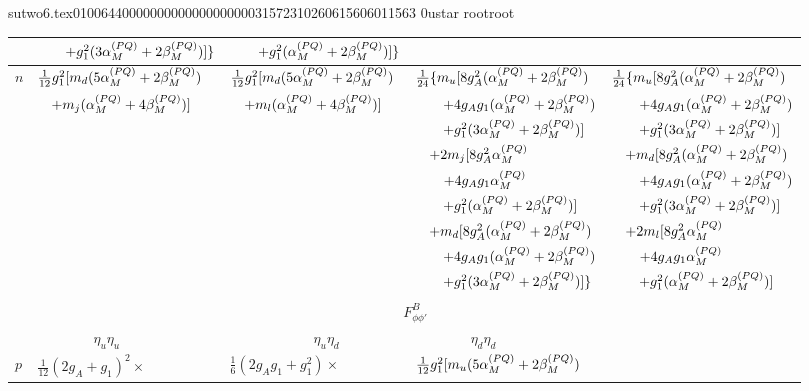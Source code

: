                                                                                                                                                                                                                                                                                       sutwo6.tex                                                                                          0100644 0000000 0000000 00000315723 10260615606 011563  0                                                                                                    ustar   root                            root                                                                                                                                                                                                                   \documentclass[prd,amssymb,amsmath,showpacs,nofootinbib,superscriptaddress]{revtex4}
\begin{document}
\begin{table}[ht]
\begin{tabular}{l | l l l l  }
& $\quad\quad +g_1^2 (3{\alpha}_M^{(PQ)} +2{\beta}_M^{(PQ)})] \}$
& $\quad\quad +g_1^2 ({\alpha}_M^{(PQ)} +2{\beta}_M^{(PQ)})] \}$
&
& \\
\hline

$n$  

&  $\frac{1}{12} g_1^2 [m_d (5{\alpha}_M^{(PQ)} +2{\beta}_M^{(PQ)}) $ 
&  $\frac{1}{12} g_1^2 [m_d (5{\alpha}_M^{(PQ)} +2{\beta}_M^{(PQ)}) $ 
&  $\frac{1}{24} \{ m_u [ 8g_A^2 ({\alpha}_M^{(PQ)} +2{\beta}_M^{(PQ)}) $ 
&  $\frac{1}{24} \{ m_u [ 8g_A^2 ({\alpha}_M^{(PQ)} +2{\beta}_M^{(PQ)}) $  \\

& $\quad + m_j ({\alpha}_M^{(PQ)} +4{\beta}_M^{(PQ)})]$
& $\quad + m_l ({\alpha}_M^{(PQ)} +4{\beta}_M^{(PQ)})] $ 
& $\quad\quad +4g_A g_1 ({\alpha}_M^{(PQ)} +2{\beta}_M^{(PQ)}) $
& $\quad\quad +4g_A g_1 ({\alpha}_M^{(PQ)} +2{\beta}_M^{(PQ)}) $\\

&
&
& $\quad\quad +g_1^2 (3{\alpha}_M^{(PQ)} +2{\beta}_M^{(PQ)})] $
& $\quad\quad +g_1^2 (3{\alpha}_M^{(PQ)} +2{\beta}_M^{(PQ)})] $ \\

&
&
& $\quad +2m_j [ 8g_A^2 {\alpha}_M^{(PQ)} $ 
& $\quad +m_d [8g_A^2 ({\alpha}_M^{(PQ)} +2{\beta}_M^{(PQ)}) $  \\

&
&
& $\quad\quad +4g_A g_1 {\alpha}_M^{(PQ)}$
& $\quad\quad +4g_A g_1 ({\alpha}_M^{(PQ)} +2{\beta}_M^{(PQ)}) $\\

&
&
& $\quad\quad +g_1^2 ({\alpha}_M^{(PQ)} +2{\beta}_M^{(PQ)})]$
& $\quad\quad +g_1^2 (3{\alpha}_M^{(PQ)} +2{\beta}_M^{(PQ)})]$ \\

&
&
& $\quad +m_d [8g_A^2 ({\alpha}_M^{(PQ)} +2{\beta}_M^{(PQ)})$
& $\quad +2m_l [ 8g_A^2 {\alpha}_M^{(PQ)} $\\

&
&
& $\quad\quad +4g_A g_1 ({\alpha}_M^{(PQ)} +2{\beta}_M^{(PQ)})$
& $\quad\quad +4g_A g_1 {\alpha}_M^{(PQ)}$\\

&
&
& $\quad\quad +g_1^2 (3{\alpha}_M^{(PQ)} +2{\beta}_M^{(PQ)})] \}$
& $\quad\quad +g_1^2 ({\alpha}_M^{(PQ)} +2{\beta}_M^{(PQ)})]$\\
\hline

\multicolumn{5}{c}{} 
\\
& \multicolumn{4}{c}{$F^B_{\phi\phi'}$ \phantom{sp}} 
\\
        & $\qquad \qquad \eta_u \eta_u$ & $\qquad \qquad \qquad \eta_u \eta_d $& $\qquad \qquad \eta_d \eta_d $ &\\
\hline
\hline
$p$   
&  $\frac{1}{12} (2g_A +g_1)^2 \times $   
&  $\frac{1}{6} (2 g_A g_1 +g_1^2) \times $  
&  $\frac{1}{12} g_1^2 [ m_u (5{\alpha}_M^{(PQ)} +2{\beta}_M^{(PQ)}) $ & \\



\end{tabular}
\end{table}
\end{document}
